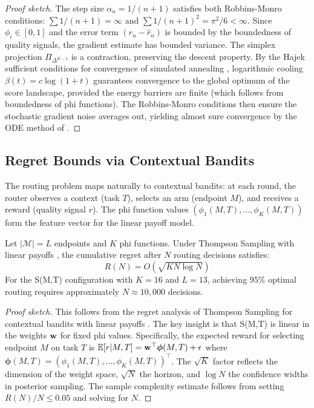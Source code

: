 \begin{proof}[Proof sketch]
The step size $\alpha_n = 1/(n+1)$ satisfies both Robbins-Monro conditions: $\sum 1/(n+1) = \infty$ and $\sum 1/(n+1)^2 = \pi^2/6 < \infty$. Since $\phi_i \in [0,1]$ and the error term $(r_n - \hat{r}_n)$ is bounded by the boundedness of quality signals, the gradient estimate has bounded variance. The simplex projection $\Pi_{\Delta^{K-1}}$ is a contraction, preserving the descent property. By the Hajek sufficient conditions for convergence of simulated annealing \citep{hajek1988cooling}, logarithmic cooling $\beta(t) = c \log(1+t)$ guarantees convergence to the global optimum of the score landscape, provided the energy barriers are finite (which follows from boundedness of phi functions). The Robbins-Monro conditions then ensure the stochastic gradient noise averages out, yielding almost sure convergence by the ODE method of \citet{kushner2003stochastic}.
\end{proof}

\subsection{Regret Bounds via Contextual Bandits}

The routing problem maps naturally to contextual bandits: at each round, the router observes a context (task $T$), selects an arm (endpoint $M$), and receives a reward (quality signal $r$). The phi function values $(\phi_1(M,T), \ldots, \phi_K(M,T))$ form the feature vector for the linear payoff model.

\begin{theorem}
\label{thm:regret}
Let $|\mathcal{M}| = L$ endpoints and $K$ phi functions. Under Thompson Sampling with linear payoffs \citep{agrawal2013thompson}, the cumulative regret after $N$ routing decisions satisfies:
\begin{equation}
\label{eq:regret}
R(N) = O\left(\sqrt{KN\log N}\right)
\end{equation}
For the S(M,T) configuration with $K=16$ and $L=13$, achieving 95\% optimal routing requires approximately $N \approx 10{,}000$ decisions.
\end{theorem}

\begin{proof}[Proof sketch]
This follows from the regret analysis of Thompson Sampling for contextual bandits with linear payoffs \citep{agrawal2013thompson}. The key insight is that S(M,T) is linear in the weights $\mathbf{w}$ for fixed phi values. Specifically, the expected reward for selecting endpoint $M$ on task $T$ is $\mathbb{E}[r | M, T] = \mathbf{w}^{\top} \boldsymbol{\phi}(M,T) + \epsilon$ where $\boldsymbol{\phi}(M,T) = (\phi_1(M,T), \ldots, \phi_K(M,T))^{\top}$. The $\sqrt{K}$ factor reflects the dimension of the weight space, $\sqrt{N}$ the horizon, and $\log N$ the confidence widths in posterior sampling. The sample complexity estimate follows from setting $R(N)/N \leq 0.05$ and solving for $N$.
\end{proof}

